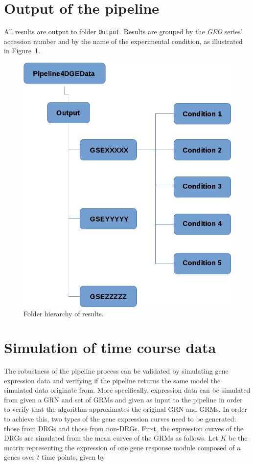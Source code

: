\documentclass[final,letterpaper,12pt]{article}
\begin{document}
\section{Output of the pipeline}
\label{section:pipeline_output}

\par All results are output to folder \texttt{Output}. Results are grouped by the \textit{GEO} series' accession number and by the name of the experimental condition, as illustrated in Figure~\ref{fig:results_hierarchy_1}.


\begin{figure}
	\centering
	\includegraphics[width=\textwidth]{FolderHierarchy1}
	\caption{Folder hierarchy of results.}
	\label{fig:results_hierarchy_1}
\end{figure}


\section{Simulation of time course data}
\label{section:simulation}

\par The robustness of the pipeline process can be validated by simulating gene expression data and verifying if the pipeline returns the same model the simulated data originate from. More specifically, expression data can be simulated from given a GRN and set of GRMs and given as input to the pipeline in order to verify that the algorithm approximates the original GRN and GRMs. In order to achieve this, two types of the gene expression curves need to be generated: those from DRGs and those from non-DRGs. First, the expression curves of the DRGs are simulated from the mean curves of the GRMs as follows. Let $K$ be the matrix representing the expression of one gene response module composed of $n$ genes over $t$ time points, given by
\end{document}

